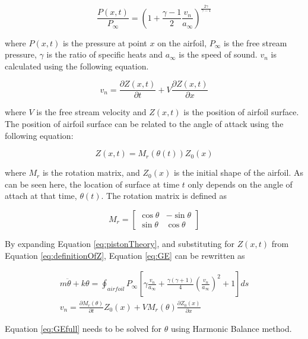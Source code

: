 \documentclass[12pt, a4paper]{extarticle}
\begin{document}
\begin{equation}\label{eq:pistonTheory}
	\frac{P(x, t)}{P_\infty} = \left( 1+ \frac{\gamma - 1}{2} \frac{v_n}{a_\infty} \right)^{\frac{2 \gamma}{\gamma - 1}}
\end{equation}

where $P(x, t)$ is the pressure at point $x$ on the airfoil, $P_\infty$ is the free stream pressure, $\gamma$ is the ratio of specific heats and $a_\infty$ is the speed of sound. $v_n$ is calculated using the following equation.

\begin{equation}\label{eq:definitionOfVn}
	v_n = \frac{\partial Z(x,t)}{\partial t} + V \frac{\partial Z(x,t)}{\partial x}
\end{equation}

where $V$ is the free stream velocity and $Z(x,t)$ is the position of airfoil surface. The position of airfoil surface can be related to the angle of attack using the following equation:

\begin{equation}\label{eq:definitionOfZ}
	Z(x,t) = M_r\left( \theta(t) \right) Z_0(x)
\end{equation}

where $M_r$ is the rotation matrix, and $Z_0(x)$ is the initial shape of the airfoil.  As can be seen here, the location of surface at time $t$ only depends on the angle of attach at that time, $\theta(t)$. The rotation matrix is defined as

\begin{equation*}
	M_r = 
	\begin{bmatrix}
		\cos \theta & -\sin \theta \\
		\sin \theta & \cos \theta
	\end{bmatrix}
\end{equation*}

By expanding Equation \eqref{eq:pistonTheory}, and substituting for $Z(x,t)$ from Equation \eqref{eq:definitionOfZ}, Equation \eqref{eq:GE} can be rewritten as

\begin{subequations}
\begin{gather}
	m\ddot{\theta} + k \theta = 
	\oint_{airfoil} P_\infty
	\left[
	\gamma \frac{v_n}{a_\infty} +
	\frac{\gamma (\gamma + 1)}{4} \left( \frac{v_n}{a_\infty}\right)^2 +
	1
	\right] ds
	\\
	v_n = 
	\frac{\partial M_r(\theta)}{\partial t}Z_0(x) + V M_r(\theta)\frac{\partial Z_0(x)}{\partial x}
\end{gather}\label{eq:GEfull}
\end{subequations}

Equation \eqref{eq:GEfull} needs to be solved for $\theta$ using Harmonic Balance method.


\end{document}
